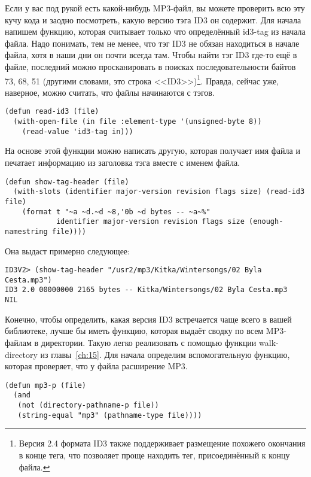 Если у вас под рукой есть какой-нибудь MP3-файл, вы можете проверить всю эту кучу кода и
заодно посмотреть, какую версию тэга ID3 он содержит. Для начала напишем функцию, которая
считывает только что определённый id3-tag из начала файла. Надо понимать, тем не менее,
что тэг ID3 не обязан находиться в начале файла, хотя в наши дни он почти всегда там.
Чтобы найти тэг ID3 где-то ещё в файле, последний можно просканировать в поисках
последовательности байтов 73, 68, 51 (другими словами, это строка <<ID3>>)\footnote{Версия
    2.4 формата ID3 также поддерживает размещение похожего окончания в конце тега, что
позволяет проще находить тег, присоединённый к концу файла.}. Правда, сейчас уже,
наверное, можно считать, что файлы начинаются с тэгов.

\begin{lstlisting}
(defun read-id3 (file)
  (with-open-file (in file :element-type '(unsigned-byte 8))
    (read-value 'id3-tag in)))
\end{lstlisting}

На основе этой функции можно написать другую, которая получает имя файла и печатает
информацию из заголовка тэга вместе с именем файла.

\begin{lstlisting}
(defun show-tag-header (file)
  (with-slots (identifier major-version revision flags size) (read-id3 file)
    (format t "~a ~d.~d ~8,'0b ~d bytes -- ~a~%"
            identifier major-version revision flags size (enough-namestring file))))
\end{lstlisting}

Она выдаст примерно следующее:

\begin{verbatim}
ID3V2> (show-tag-header "/usr2/mp3/Kitka/Wintersongs/02 Byla Cesta.mp3")
ID3 2.0 00000000 2165 bytes -- Kitka/Wintersongs/02 Byla Cesta.mp3
NIL
\end{verbatim}

Конечно, чтобы определить, какая версия ID3 встречается чаще всего в вашей библиотеке,
лучше бы иметь функцию, которая выдаёт сводку по всем MP3-файлам в директории. Такую легко
реализовать с помощью функции walk-directory из главы~\ref{ch:15}. Для начала определим
вспомогательную функцию, которая проверяет, что у файла расширение MP3.

\begin{lstlisting}
(defun mp3-p (file)
  (and
   (not (directory-pathname-p file))
   (string-equal "mp3" (pathname-type file))))
\end{lstlisting}

